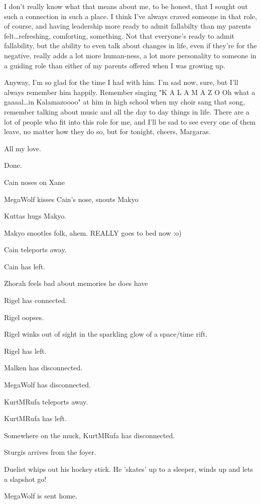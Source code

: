 \begin{hangparas}{2em}{1}
I don't really know what that means about me, to be honest, that I sought out such a connection in such a place.  I think I've always craved someone in that role, of course, and having leadership more ready to admit fallabilty than my parents felt\ldots{}refreshing, comforting, something.  Not that everyone's ready to admit fallability, but the ability to even talk about changes in life, even if they're for the negative, really adds a lot more human-ness, a lot more personality to someone in a guiding role than either of my parents offered when I was growing up.

Anyway, I'm so glad for the time I had with him.  I'm sad now, sure, but I'll always remember him happily.  Remember singing "K A L A M A Z O Oh what a gaaaal\ldots{}in Kalamazoooo" at him in high school when my choir sang that song, remember talking about music and all the day to day things in life.  There are a lot of people who fit into this role for me, and I'll be sad to see every one of them leave, no matter how they do so, but for tonight, cheers, Margaras.

All my love.

\noindent Done.

Cain noses on Xane

MegaWolf kisses Cain's nose, snouts Makyo

Kuttas hugs Makyo.

Makyo snootles folk, ahem.  REALLY goes to bed now :o)

Cain teleports away.

Cain has left.

Zhorah feels bad about memories he does have

Rigel has connected.

Rigel oopses.

Rigel winks out of sight in the sparkling glow of a space/time rift.

Rigel has left.

Malken has disconnected.

MegaWolf has disconnected.

KurtMRufa teleports away.

KurtMRufa has left.

Somewhere on the muck, KurtMRufa has disconnected.

Sturgis arrives from the foyer.

Duelist whips out his hockey stick. He 'skates' up to a sleeper, winds up and lets a slapshot go!

MegaWolf is sent home.


\end{hangparas}
